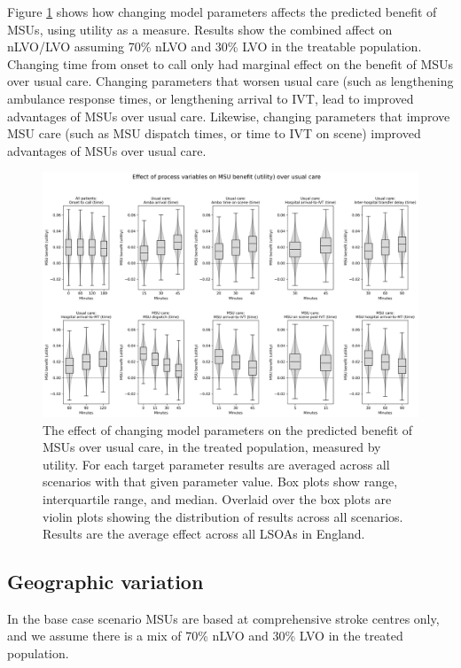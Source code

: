 Figure \ref{fig:scenarios_utility} shows how changing model parameters affects the predicted benefit of MSUs, using utility as a measure. Results show the combined affect on nLVO/LVO assuming 70\% nLVO and 30\% LVO  in the treatable population. Changing time from onset to call only had marginal effect on the benefit of MSUs over usual care. Changing parameters that worsen usual care (such as lengthening ambulance response times, or lengthening arrival to IVT, lead to improved advantages of MSUs over usual care. Likewise, changing parameters that improve MSU care (such as MSU dispatch times, or time to IVT on scene) improved advantages of MSUs over usual care.

\begin{figure}[h]
    \centering
    \includegraphics[width=1\linewidth]{images/msu_net_utility_benefit.png}
    \caption{The effect of changing model parameters on the predicted benefit of MSUs over usual care, in the treated population, measured by utility. For each target parameter results are averaged across all scenarios with that given parameter value. Box plots show range, interquartile range, and median. Overlaid over the box plots are violin plots showing the distribution of results across all scenarios. Results are the average effect across all LSOAs in England.}
    \label{fig:scenarios_utility}
\end{figure}

\subsection{Geographic variation}

In the base case scenario MSUs are based at comprehensive stroke centres only, and we assume there is a mix of 70\% nLVO and 30\% LVO in the treated population.

